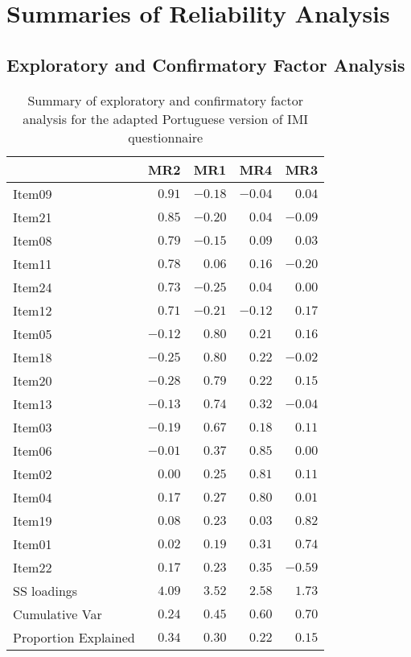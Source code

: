 \section{Summaries of Reliability Analysis}

\subsection{Exploratory and Confirmatory Factor Analysis}

\begin{table}[!htbp]
\caption{Summary of exploratory and confirmatory factor analysis for the adapted Portuguese version of IMI questionnaire\label{fa}} 
\begin{center}
\begin{tabular}{lrrrr}
\hline\hline
\multicolumn{1}{l}{}&\multicolumn{1}{c}{MR2}&\multicolumn{1}{c}{MR1}&\multicolumn{1}{c}{MR4}&\multicolumn{1}{c}{MR3}\tabularnewline
\hline
Item09&$ 0.91$&$-0.18$&$-0.04$&$ 0.04$\tabularnewline
Item21&$ 0.85$&$-0.20$&$ 0.04$&$-0.09$\tabularnewline
Item08&$ 0.79$&$-0.15$&$ 0.09$&$ 0.03$\tabularnewline
Item11&$ 0.78$&$ 0.06$&$ 0.16$&$-0.20$\tabularnewline
Item24&$ 0.73$&$-0.25$&$ 0.04$&$ 0.00$\tabularnewline
Item12&$ 0.71$&$-0.21$&$-0.12$&$ 0.17$\tabularnewline
Item05&$-0.12$&$ 0.80$&$ 0.21$&$ 0.16$\tabularnewline
Item18&$-0.25$&$ 0.80$&$ 0.22$&$-0.02$\tabularnewline
Item20&$-0.28$&$ 0.79$&$ 0.22$&$ 0.15$\tabularnewline
Item13&$-0.13$&$ 0.74$&$ 0.32$&$-0.04$\tabularnewline
Item03&$-0.19$&$ 0.67$&$ 0.18$&$ 0.11$\tabularnewline
Item06&$-0.01$&$ 0.37$&$ 0.85$&$ 0.00$\tabularnewline
Item02&$ 0.00$&$ 0.25$&$ 0.81$&$ 0.11$\tabularnewline
Item04&$ 0.17$&$ 0.27$&$ 0.80$&$ 0.01$\tabularnewline
Item19&$ 0.08$&$ 0.23$&$ 0.03$&$ 0.82$\tabularnewline
Item01&$ 0.02$&$ 0.19$&$ 0.31$&$ 0.74$\tabularnewline
Item22&$ 0.17$&$ 0.23$&$ 0.35$&$-0.59$\tabularnewline
SS loadings&$ 4.09$&$ 3.52$&$ 2.58$&$ 1.73$\tabularnewline
Cumulative Var&$ 0.24$&$ 0.45$&$ 0.60$&$ 0.70$\tabularnewline
Proportion Explained&$ 0.34$&$ 0.30$&$ 0.22$&$ 0.15$\tabularnewline
\hline
\end{tabular}\end{center}

\end{table}

